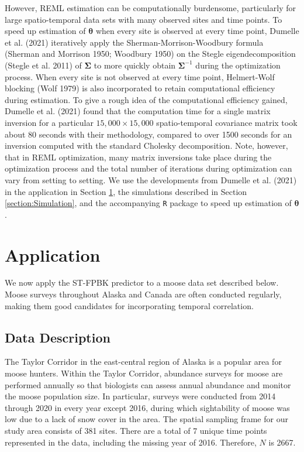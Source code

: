 \documentclass[smallextended]{svjour3}       %
\begin{document}
However, REML estimation can be computationally burdensome, particularly
for large spatio-temporal data sets with many observed sites and time
points. To speed up estimation of \(\bm{\theta}\) when every site is
observed at every time point, Dumelle et al. (2021) iteratively apply
the Sherman-Morrison-Woodbury formula (Sherman and Morrison 1950;
Woodbury 1950) on the Stegle eigendecomposition (Stegle et al. 2011) of
\(\bm{\Sigma}\) to more quickly obtain \(\bm{\Sigma}^{-1}\) during the
optimization process. When every site is not observed at every time
point, Helmert-Wolf blocking (Wolf 1979) is also incorporated to retain
computational efficiency during estimation. To give a rough idea of the
computational efficiency gained, Dumelle et al. (2021) found that the
computation time for a single matrix inversion for a particular
\(15,000 \times 15,000\) spatio-temporal covariance matrix took about 80
seconds with their methodology, compared to over 1500 seconds for an
inversion computed with the standard Cholesky decomposition. Note,
however, that in REML optimization, many matrix inversions take place
during the optimization process and the total number of iterations
during optimization can vary from setting to setting. We use the
developments from Dumelle et al. (2021) in the application in Section
\ref{section:Application}, the simulations described in Section
\ref{section:Simulation}, and the accompanying \texttt{R} package to
speed up estimation of \(\bm{\theta}\).

\hypertarget{section:Application}{%
\section{Application}\label{section:Application}}

We now apply the ST-FPBK predictor to a moose data set described below.
Moose surveys throughout Alaska and Canada are often conducted
regularly, making them good candidates for incorporating temporal
correlation.

\hypertarget{data-description}{%
\subsection{Data Description}\label{data-description}}

The Taylor Corridor in the east-central region of Alaska is a popular
area for moose hunters. Within the Taylor Corridor, abundance surveys
for moose are performed annually so that biologists can assess annual
abundance and monitor the moose population size. In particular, surveys
were conducted from 2014 through 2020 in every year except 2016, during
which sightability of moose was low due to a lack of snow cover in the
area. The spatial sampling frame for our study area consists of 381
sites. There are a total of 7 unique time points represented in the
data, including the missing year of 2016. Therefore, \(N\) is 2667.
\end{document}
